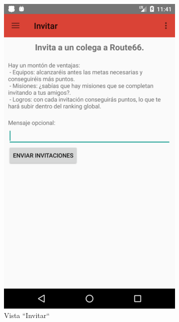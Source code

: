\documentclass[twoside]{report}
\begin{document}
\begin{figure}[H]
\begin{center}
	\begin{subfigure}[t]{.3\linewidth}
		\includegraphics[scale=0.25]{images/userguide/11.png}
		\caption{Vista “Invitar“}
	\end{subfigure}\hspace{2mm}%
	\begin{subfigure}[t]{.3\linewidth}

\end{subfigure}
\end{center}
\end{figure}
\end{document}
